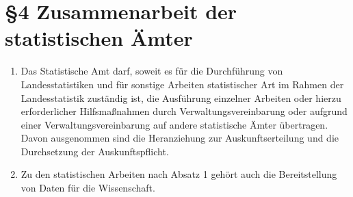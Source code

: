     \section[\S4 Zusammenarbeit]{\S4 Zusammenarbeit der statistischen Ämter}
        \begin{enumerate}[label=(\arabic*)]
            \item Das Statistische Amt darf, soweit es für die Durchführung von Landesstatistiken und für sonstige Arbeiten statistischer Art im Rahmen der Landesstatistik zuständig ist, die Ausführung einzelner Arbeiten oder hierzu erforderlicher Hilfsmaßnahmen durch Verwaltungsvereinbarung oder aufgrund einer Verwaltungsvereinbarung auf andere statistische Ämter übertragen. Davon ausgenommen sind die Heranziehung zur Auskunftserteilung und die Durchsetzung der Auskunftspflicht.
            \item Zu den statistischen Arbeiten nach Absatz 1 gehört auch die Bereitstellung von Daten für die Wissenschaft.
        \end{enumerate}
 
